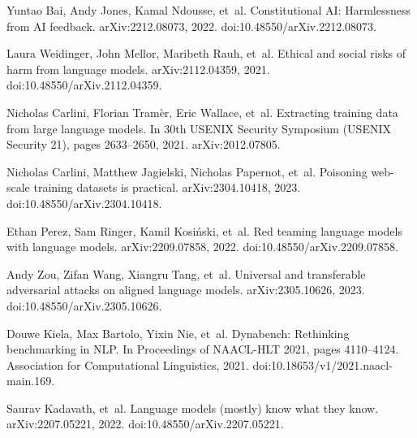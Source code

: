 \documentclass[10pt]{article}
\begin{document}
\begin{thebibliography}{99}
Yuntao Bai, Andy Jones, Kamal Ndousse, et~al.
\newblock Constitutional AI: Harmlessness from AI feedback.
\newblock arXiv:2212.08073, 2022.
\newblock doi:10.48550/arXiv.2212.08073.

Laura Weidinger, John Mellor, Maribeth Rauh, et~al.
\newblock Ethical and social risks of harm from language models.
\newblock arXiv:2112.04359, 2021.
\newblock doi:10.48550/arXiv.2112.04359.

Nicholas Carlini, Florian Tram{\`e}r, Eric Wallace, et~al.
\newblock Extracting training data from large language models.
\newblock In 30th USENIX Security Symposium (USENIX Security 21), pages 2633--2650, 2021.
\newblock arXiv:2012.07805.

Nicholas Carlini, Matthew Jagielski, Nicholas Papernot, et~al.
\newblock Poisoning web-scale training datasets is practical.
\newblock arXiv:2304.10418, 2023.
\newblock doi:10.48550/arXiv.2304.10418.

Ethan Perez, Sam Ringer, Kamil Kosi{\'n}ski, et~al.
\newblock Red teaming language models with language models.
\newblock arXiv:2209.07858, 2022.
\newblock doi:10.48550/arXiv.2209.07858.

Andy Zou, Zifan Wang, Xiangru Tang, et~al.
\newblock Universal and transferable adversarial attacks on aligned language models.
\newblock arXiv:2305.10626, 2023.
\newblock doi:10.48550/arXiv.2305.10626.

Douwe Kiela, Max Bartolo, Yixin Nie, et~al.
\newblock Dynabench: Rethinking benchmarking in NLP.
\newblock In Proceedings of NAACL-HLT 2021, pages 4110--4124. Association for Computational Linguistics, 2021.
\newblock doi:10.18653/v1/2021.naacl-main.169.

Saurav Kadavath, et~al.
\newblock Language models (mostly) know what they know.
\newblock arXiv:2207.05221, 2022.
\newblock doi:10.48550/arXiv.2207.05221.


\end{thebibliography}
\end{document}
